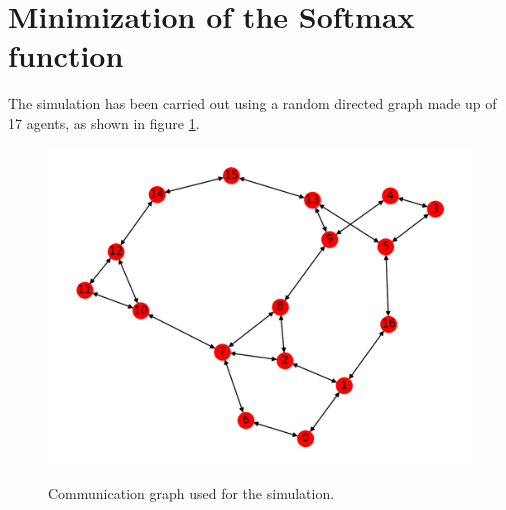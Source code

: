 \documentclass[a4paper,11pt,oneside]{book}
\begin{document}
\section{Minimization of the Softmax function}
The simulation has been carried out using a random directed graph made up of 17 agents, as shown in figure \ref{graph_17_agents}. \\
\begin{figure}[hb]
	\centering
	{\includegraphics[scale=.55]{figs/Graph}}
	\caption{Communication graph used for the simulation.}
	\label{graph_17_agents}
\end{figure}
\end{document}
